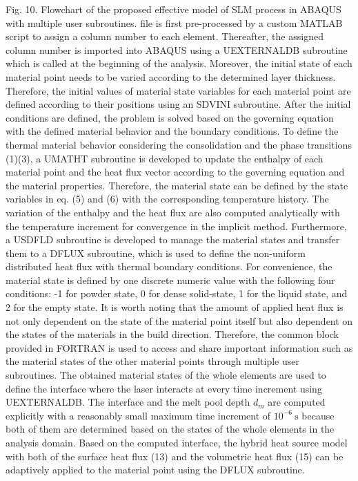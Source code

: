 \documentclass[10pt]{article}
\begin{document}
Fig. 10. Flowchart of the proposed effective model of SLM process in ABAQUS with multiple user subroutines. file is first pre-processed by a custom MATLAB script to assign a column number to each element. Thereafter, the assigned column number is imported into ABAQUS using a UEXTERNALDB subroutine which is called at the beginning of the analysis. Moreover, the initial state of each material point needs to be varied according to the determined layer thickness. Therefore, the initial values of material state variables for each material point are defined according to their positions using an SDVINI subroutine. After the initial conditions are defined, the problem is solved based on the governing equation with the defined material behavior and the boundary conditions. To define the thermal material behavior considering the consolidation and the phase transitions (1)(3), a UMATHT subroutine is developed to update the enthalpy of each material point and the heat flux vector according to the governing equation and the material properties. Therefore, the material state can be defined by the state variables in eq. (5) and (6) with the corresponding temperature history. The variation of the enthalpy and the heat flux are also computed analytically with the temperature increment for convergence in the implicit method. Furthermore, a USDFLD subroutine is developed to manage the material states and transfer them to a DFLUX subroutine, which is used to define the non-uniform distributed heat flux with thermal boundary conditions. For convenience, the material state is defined by one discrete numeric value with the following four conditions: -1 for powder state, 0 for dense solid-state, 1 for the liquid state, and 2 for the empty state. It is worth noting that the amount of applied heat flux is not only dependent on the state of the material point itself but also dependent on the states of the materials in the build direction. Therefore, the common block provided in FORTRAN is used to access and share important information such as the material states of the other material points through multiple user subroutines. The obtained material states of the whole elements are used to define the interface where the laser interacts at every time increment using UEXTERNALDB. The interface and the melt pool depth $d_{m}$ are computed explicitly with a reasonably small maximum time increment of $10^{-6} \mathrm{~s}$ because both of them are determined based on the states of the whole elements in the analysis domain. Based on the computed interface, the hybrid heat source model with both of the surface heat flux (13) and the volumetric heat flux (15) can be adaptively applied to the material point using the DFLUX subroutine.
\end{document}
